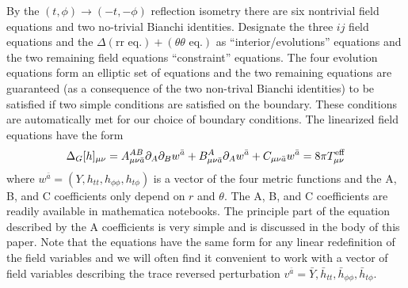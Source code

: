 \documentclass[aps,prd,amsmath,showpacs,amssymb,superscriptaddress,nofootinbib,longbibliography,eqsecnum,preprintnumbers]{revtex4-1}
\begin{document}
\begin{enumerate}
By the $(t,\phi)\to (-t,-\phi)$ reflection isometry there are six nontrivial field equations and two no-trivial Bianchi identities. Designate the three $ij$ field equations and the $\Delta (\text{rr eq.})+(\theta \theta\text{ eq.})$ as ``interior/evolutions'' equations and the two remaining field equations ``constraint'' equations. The four evolution equations form an elliptic set of equations and the two remaining equations are guaranteed (as a consequence of the two non-trival Bianchi identities) to be satisfied if two simple conditions are satisfied on the boundary. These conditions are automatically met for our choice of boundary conditions. The linearized field equations have the form
\begin{align}
\Delta_G[h]_{\mu\nu}= A_{\mu \nu \bar a}^{AB}\partial_A\partial_B w^{\bar a} + B_{\mu \nu \bar a}^{A}\partial_A w^{\bar a}+C_{\mu \nu \bar a}w^{\bar a} =8\pi T_{\mu\nu}^{\rm eff}
\end{align}
where $w^{\bar a}=(Y,h_{tt},h_{\phi\phi},h_{t\phi})$ is a vector of the four metric functions and the A, B, and C coefficients only depend on $r$ and $\theta$.
The A, B, and C coefficients are readily available in mathematica notebooks. The principle part of the equation described by the A coefficients is very simple and is discussed in the body of this paper. Note that the equations have the same form for any linear redefinition of the field variables and we will often find it convenient to work with a vector of field variables describing the trace reversed perturbation $v^{\bar a}={\bar Y, \bar h_{tt}, \bar h_{\phi\phi}, \bar h_{t\phi}}$.
\end{enumerate}
\end{document}
